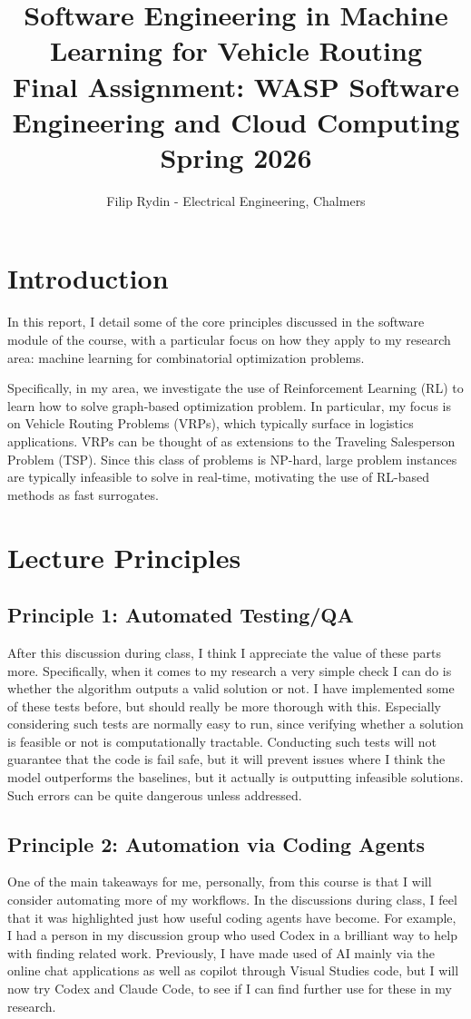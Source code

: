 \documentclass[11pt]{article}
\title{\Large Software Engineering in Machine Learning for Vehicle Routing \\[5pt] \large Final Assignment: WASP Software Engineering and Cloud Computing \\[5pt] Spring 2026}
\author{Filip Rydin - Electrical Engineering, Chalmers}
\date{}
\begin{document}
\maketitle

\section{Introduction}
In this report, I detail some of the core principles discussed in the software module of the course, with a particular focus on how they apply to my research area: machine learning for combinatorial optimization problems.  

Specifically, in my area, we investigate the use of Reinforcement Learning (RL) to learn how to solve graph-based optimization problem. In particular, my focus is on Vehicle Routing Problems (VRPs), which typically surface in logistics applications. VRPs can be thought of as extensions to the Traveling Salesperson Problem (TSP). Since this class of problems is NP-hard, large problem instances are typically infeasible to solve in real-time, motivating the use of RL-based methods as fast surrogates. 

\section{Lecture Principles}

\subsection{Principle 1: Automated Testing/QA}
After this discussion during class, I think I appreciate the value of these parts more. Specifically, when it comes to my research a very simple check I can do is whether the algorithm outputs a valid solution or not. I have implemented some of these tests before, but should really be more thorough with this. Especially considering such tests are normally easy to run, since verifying whether a solution is feasible or not is computationally tractable. Conducting such tests will not guarantee that the code is fail safe, but it will prevent issues where I think the model outperforms the baselines, but it actually is outputting infeasible solutions. Such errors can be quite dangerous unless addressed. 

\subsection{Principle 2: Automation via Coding Agents}
One of the main takeaways for me, personally, from this course is that I will consider automating more of my workflows. In the discussions during class, I feel that it was highlighted just how useful coding agents have become. For example, I had a person in my discussion group who used Codex in a brilliant way to help with finding related work. Previously, I have made used of AI mainly via the online chat applications as well as copilot through Visual Studies code, but I will now try Codex and Claude Code, to see if I can find further use for these in my research. 
\end{document}
